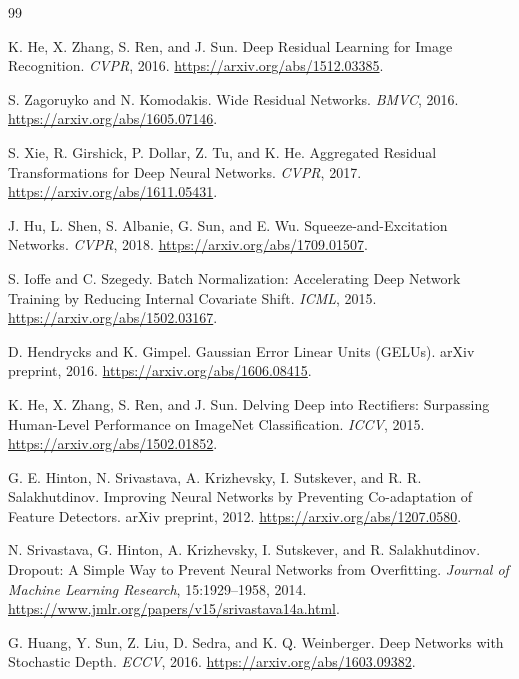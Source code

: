 \documentclass[11pt]{article}
\begin{document}
\clearpage
\begin{thebibliography}{99}

K. He, X. Zhang, S. Ren, and J. Sun.
\newblock Deep Residual Learning for Image Recognition.
\newblock \emph{CVPR}, 2016.
\newblock \url{https://arxiv.org/abs/1512.03385}.

S. Zagoruyko and N. Komodakis.
\newblock Wide Residual Networks.
\newblock \emph{BMVC}, 2016.
\newblock \url{https://arxiv.org/abs/1605.07146}.

S. Xie, R. Girshick, P. Dollar, Z. Tu, and K. He.
\newblock Aggregated Residual Transformations for Deep Neural Networks.
\newblock \emph{CVPR}, 2017.
\newblock \url{https://arxiv.org/abs/1611.05431}.

J. Hu, L. Shen, S. Albanie, G. Sun, and E. Wu.
\newblock Squeeze-and-Excitation Networks.
\newblock \emph{CVPR}, 2018.
\newblock \url{https://arxiv.org/abs/1709.01507}.

S. Ioffe and C. Szegedy.
\newblock Batch Normalization: Accelerating Deep Network Training by Reducing
Internal Covariate Shift.
\newblock \emph{ICML}, 2015.
\newblock \url{https://arxiv.org/abs/1502.03167}.

D. Hendrycks and K. Gimpel.
\newblock Gaussian Error Linear Units (GELUs).
\newblock arXiv preprint, 2016.
\newblock \url{https://arxiv.org/abs/1606.08415}.

K. He, X. Zhang, S. Ren, and J. Sun.
\newblock Delving Deep into Rectifiers: Surpassing Human-Level Performance on
ImageNet Classification.
\newblock \emph{ICCV}, 2015.
\newblock \url{https://arxiv.org/abs/1502.01852}.

G. E. Hinton, N. Srivastava, A. Krizhevsky, I. Sutskever, and R. R. Salakhutdinov.
\newblock Improving Neural Networks by Preventing Co-adaptation of Feature
Detectors.
\newblock arXiv preprint, 2012.
\newblock \url{https://arxiv.org/abs/1207.0580}.

N. Srivastava, G. Hinton, A. Krizhevsky, I. Sutskever, and R. Salakhutdinov.
\newblock Dropout: A Simple Way to Prevent Neural Networks from Overfitting.
\newblock \emph{Journal of Machine Learning Research}, 15:1929--1958, 2014.
\newblock \url{https://www.jmlr.org/papers/v15/srivastava14a.html}.

G. Huang, Y. Sun, Z. Liu, D. Sedra, and K. Q. Weinberger.
\newblock Deep Networks with Stochastic Depth.
\newblock \emph{ECCV}, 2016.
\newblock \url{https://arxiv.org/abs/1603.09382}.


\end{thebibliography}
\end{document}
